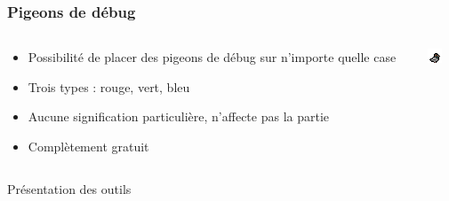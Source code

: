 \documentclass[table]{beamer}
\begin{document}
\begin{frame}
    \frametitle{Pigeons de débug}
    \begin{columns}[T]
    \begin{column}{0.65\textwidth}
        \begin{itemize}
            \item Possibilité de placer des pigeons de débug sur n'importe quelle case
            \item Trois types : rouge, vert, bleu
            \item Aucune signification particulière, n'affecte pas la partie
            \item Complètement gratuit
        \end{itemize}
    \end{column}
    \begin{column}{0.45\textwidth}
        \centering
         \begin{minipage}{0.7\textwidth}
            \includegraphics[width=\textwidth]{img/sprite/pigeon.png}
            \end{minipage}
    \end{column}
    \end{columns}    
\end{frame}

\begin{frame}
    \begin{center}
        \huge{Présentation des outils}
    \end{center}
\end{frame}
\end{document}
